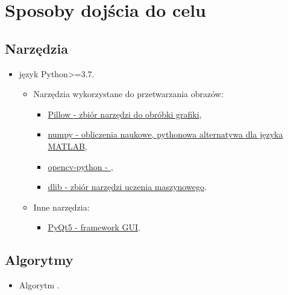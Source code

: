 \section{Sposoby dojścia do celu}




\subsection{Narzędzia}

\renewcommand\labelitemii{$\bullet$}
\renewcommand\labelitemiii{$\bullet$}

\begin{itemize}
    \item język Python>=3.7.
    \begin{itemize}
        \item Narzędzia wykorzystane do przetwarzania obrazów:
        \begin{itemize}     
            \item \href{https://pillow.readthedocs.io/en/stable/}{Pillow - zbiór narzędzi do obróbki grafiki}\cite{pillow},
            \item \href{https://numpy.org/}{numpy - obliczenia naukowe, pythonowa alternatywa dla języka MATLAB}\cite{numpy},
            \item \href{https://pypi.org/project/opencv-python/}{opencv-python - }\cite{opencv-python},
            \item \href{http://dlib.net/}{dlib - zbiór narzędzi uczenia maszynowego}\cite{dlib}.
        \end{itemize}   
        \item Inne narzędzia:
        \begin{itemize}
            \item \href{https://pypi.org/project/PyQt5/}{PyQt5 - framework GUI}\cite{pyqt5}.
        \end{itemize}
    \end{itemize}
\end{itemize}

\subsection{Algorytmy}
\begin{itemize}
    \item Algorytm \href{http://www.csc.kth.se/~vahidk/face_ert.html}{}\cite{face-ert}.
\end{itemize}

